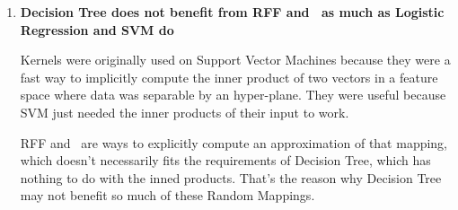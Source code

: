 \begin{pre-delivery}
\begin{enumerate}
    It is possible that for some models, this is too much randomization of
    the data, and it coud have a bad effect on the learning process.

    \item \textbf{Decision Tree does not benefit from RFF and \Nys\ as much as
    Logistic Regression and SVM do}

    Kernels were originally used on Support Vector Machines because they were
    a fast way to implicitly compute the inner product of two vectors in a
    feature space where data was separable by an hyper-plane. They were
    useful because SVM just needed the inner products of their input to work.

    RFF and \Nys\ are ways to explicitly compute an approximation of that
    mapping, which doesn't necessarily fits the requirements of Decision Tree,
    which has nothing to do with the inned products. That's the reason why
    Decision Tree may not benefit so much of these Random Mappings.
  \end{enumerate}
\end{pre-delivery}
